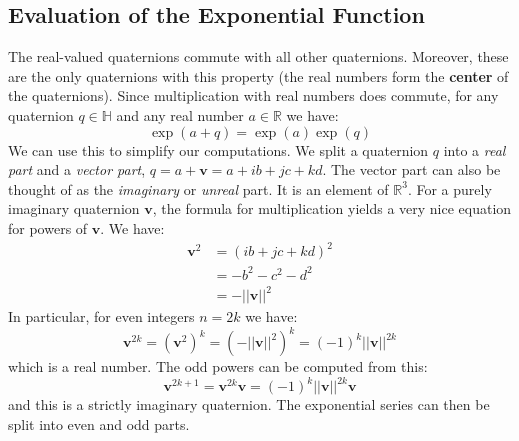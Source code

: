 \documentclass{article}
\theoremstyle{plain}
\theoremstyle{normal}
\begin{document}
        \subsection{Evaluation of the Exponential Function}
            The real-valued quaternions commute with all other quaternions.
            Moreover, these are the only quaternions with this property
            (the real numbers form the \textbf{center} of the quaternions).
            Since multiplication with real numbers does commute, for any
            quaternion $q\in\mathbb{H}$ and any real number
            $a\in\mathbb{R}$ we have:
            \begin{equation}
                \exp(a+q)=\exp(a)\exp(q)
            \end{equation}
            We can use this to simplify our computations. We split a
            quaternion $q$ into a \textit{real part} and a \textit{vector part},
            $q=a+\mathbf{v}=a+ib+jc+kd$. The vector part can also be thought of
            as the \textit{imaginary} or \textit{unreal} part. It is an element
            of $\mathbb{R}^{3}$. For a purely imaginary quaternion
            $\mathbf{v}$, the formula for multiplication yields a very nice
            equation for powers of $\mathbf{v}$. We have:
            \begin{subequations}
                \begin{align}
                    \mathbf{v}^{2}
                    &=(ib+jc+kd)^{2}\\
                    &=-b^{2}-c^{2}-d^{2}\\
                    &=-||\mathbf{v}||^{2}
                \end{align}
            \end{subequations}
            In particular, for even integers $n=2k$ we have:
            \begin{equation}
                \mathbf{v}^{2k}
                =(\mathbf{v}^{2})^{k}
                =(-||\mathbf{v}||^{2})^{k}
                =(-1)^{k}||\mathbf{v}||^{2k}
            \end{equation}
            which is a real number. The odd powers can be computed from this:
            \begin{equation}
                \mathbf{v}^{2k+1}
                =\mathbf{v}^{2k}\mathbf{v}
                =(-1)^{k}||\mathbf{v}||^{2k}\mathbf{v}
            \end{equation}
            and this is a strictly imaginary quaternion.
            The exponential series can then be split into even and odd parts.
\end{document}
